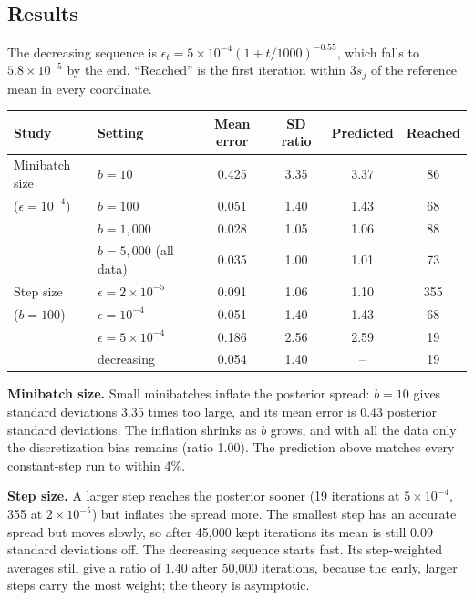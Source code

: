 \documentclass[11pt]{article}
\begin{document}
\subsection*{Results}

The decreasing sequence is $\epsilon_t=5\times10^{-4}(1+t/1000)^{-0.55}$, which falls to
$5.8\times10^{-5}$ by the end. ``Reached'' is the first iteration within $3s_j$ of the reference mean in every
coordinate.

\begin{center}
\begin{tabular}{llcccc}
\toprule
\textbf{Study} & \textbf{Setting} & \textbf{Mean error} & \textbf{SD ratio} & \textbf{Predicted} & \textbf{Reached} \\
\midrule
Minibatch size & $b=10$ & 0.425 & 3.35 & 3.37 & 86 \\
($\epsilon=10^{-4}$) & $b=100$ & 0.051 & 1.40 & 1.43 & 68 \\
 & $b=1{,}000$ & 0.028 & 1.05 & 1.06 & 88 \\
 & $b=5{,}000$ (all data) & 0.035 & 1.00 & 1.01 & 73 \\
\midrule
Step size & $\epsilon=2\times10^{-5}$ & 0.091 & 1.06 & 1.10 & 355 \\
($b=100$) & $\epsilon=10^{-4}$ & 0.051 & 1.40 & 1.43 & 68 \\
 & $\epsilon=5\times10^{-4}$ & 0.186 & 2.56 & 2.59 & 19 \\
 & decreasing & 0.054 & 1.40 & -- & 19 \\
\bottomrule
\end{tabular}
\end{center}

\textbf{Minibatch size.} Small minibatches inflate the posterior spread: $b=10$ gives standard deviations 3.35
times too large, and its mean error is 0.43 posterior standard deviations. The inflation shrinks as $b$
grows, and with all the data only the discretization bias remains (ratio 1.00). The prediction above matches
every constant-step run to within 4\%.

\textbf{Step size.} A larger step reaches the posterior sooner (19 iterations at $5\times10^{-4}$, 355 at
$2\times10^{-5}$) but inflates the spread more. The smallest step has an accurate spread but moves slowly, so
after 45,000 kept iterations its mean is still 0.09 standard deviations off. The decreasing sequence starts
fast. Its step-weighted averages still give a ratio of 1.40 after 50,000 iterations, because the early, larger
steps carry the most weight; the theory is asymptotic.
\end{document}
